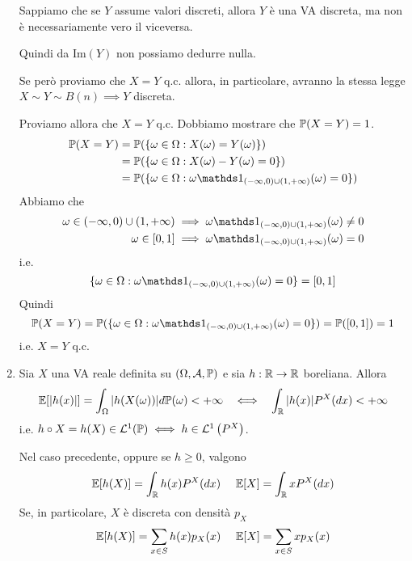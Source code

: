\begin{enumerate}
\begin{rem}
Sappiamo che se $Y$ assume valori discreti, allora $Y$ è una VA discreta, ma non è necessariamente vero il viceversa.
\end{rem}

Quindi da $\mathrm{Im}(Y)$ non possiamo dedurre nulla.

Se però proviamo che $X=Y$ q.c. allora, in particolare, avranno la stessa legge $X\sim Y\sim B(n) \implies Y$ discreta.

Proviamo allora che $X=Y$ q.c. Dobbiamo mostrare che $\mathbb{P}(X=Y) =1$.
\begin{align*}
\PP(X=Y) & =\PP(\{\omega \in \Omega :X(\omega) =Y(\omega)\})\\
 & =\PP(\{\omega \in \Omega :X(\omega) -Y(\omega) =0\})\\
 & =\PP(\{\omega \in \Omega :\omega \Ind_{(-\infty ,0) \cup (1,+\infty)}(\omega) =0\})
\end{align*}
Abbiamo che
\begin{align*}
\omega \in (-\infty ,0) \cup (1,+\infty) & \implies \omega \Ind_{(-\infty ,0) \cup (1,+\infty)}(\omega) \neq 0\\
\omega \in [0,1] & \implies \omega \Ind_{(-\infty ,0) \cup (1,+\infty)}(\omega) =0
\end{align*}
i.e.
\begin{equation*}
\{\omega \in \Omega :\omega \Ind_{(-\infty ,0) \cup (1,+\infty)}(\omega) =0\} =[0,1]
\end{equation*}
Quindi
\begin{equation*}
\PP(X=Y) =\PP(\{\omega \in \Omega :\omega \Ind_{(-\infty ,0) \cup (1,+\infty)}(\omega) =0\}) =\PP([0,1]) =1
\end{equation*}
i.e. $X=Y$ q.c.
\item
\begin{thm}
Sia $X$ una VA reale definita su $(\Omega,\mathcal{A},\mathbb{P})$ e sia $h:\mathbb{R}\rightarrow \mathbb{R}$ boreliana. Allora
\begin{equation*}
\mathbb{E}[|h(x)|] =\int_{\Omega }| h(X(\omega))| d\mathbb{P}(\omega) < +\infty \ \ \iff \ \ \int_{\mathbb{R}}| h(x)| P^{X}(dx) < +\infty 
\end{equation*}
i.e. $h\circ X=h(X) \in \mathcal{L}^{1}(\mathbb{P}) \iff h\in \mathcal{L}^{1}\left(P^{X}\right)$.

Nel caso precedente, oppure se $h\geq 0$, valgono
\begin{equation*}
\mathbb{E}[h(X)] =\int_{\mathbb{R}} h(x) P^{X}(dx) \ \ \ \ \mathbb{E}[X] =\int_{\mathbb{R}} xP^{X}(dx)
\end{equation*}
Se, in particolare, $X$ è discreta con densità $p_{X}$
\begin{equation*}
\mathbb{E}[h(X)] =\sum\limits_{x\in S} h(x) p_{X}(x) \ \ \ \ \mathbb{E}[X] =\sum\limits_{x\in S} xp_{X}(x)
\end{equation*}
\end{thm}


\end{enumerate}
